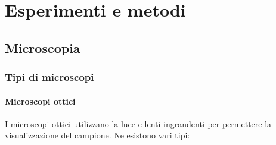 \chapter{Esperimenti e metodi}
\section{Microscopia}
\subsection{Tipi di microscopi}
\subsubsection{Microscopi ottici}
I microscopi ottici utilizzano la luce e lenti ingrandenti per permettere la visualizzazione del campione. Ne esistono vari tipi:
